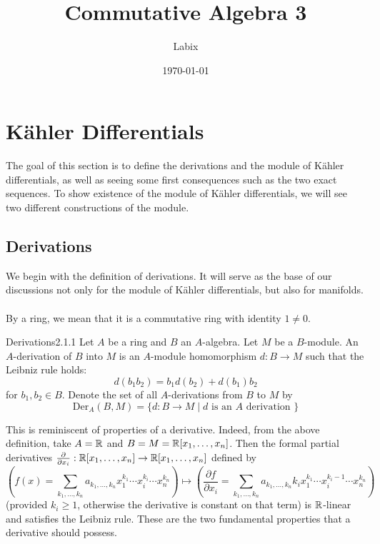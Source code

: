 \documentclass[a4paper]{article}
\title{Commutative Algebra 3}
\author{Labix}
\date{\today}
\begin{document}
\maketitle
\begin{abstract}
\end{abstract}
\pagebreak
\tableofcontents
\pagebreak

\section{Kähler Differentials}
The goal of this section is to define the derivations and the module of Kähler differentials, as well as seeing some first consequences such as the two exact sequences. To show existence of the module of Kähler differentials, we will see two different constructions of the module. 

\subsection{Derivations}
We begin with the definition of derivations. It will serve as the base of our discussions not only for the module of Kähler differentials, but also for manifolds. \\~\\

By a ring, we mean that it is a commutative ring with identity $1\neq 0$. 

\begin{defn}{Derivations}{2.1.1} Let $A$ be a ring and $B$ an $A$-algebra. Let $M$ be a $B$-module. An $A$-derivation of $B$ into $M$ is an $A$-module homomorphism $d:B\to M$ such that the Leibniz rule holds: $$d(b_1b_2)=b_1d(b_2)+d(b_1)b_2$$ for $b_1,b_2\in B$. Denote the set of all $A$-derivations from $B$ to $M$ by $$\text{Der}_A(B,M)=\{d:B\to M\;|\;d\text{ is an }A\text{ derivation }\}$$
\end{defn}

This is reminiscent of properties of a derivative. Indeed, from the above definition, take $A=\mathbb{R}$ and $B=M=\mathbb{R}[x_1,\dots,x_n]$. Then the formal partial derivatives $\frac{\partial}{\partial x_i}:\mathbb{R}[x_1,\dots,x_n]\to\mathbb{R}[x_1,\dots,x_n]$ defined by $$\left(f(x)=\sum_{k_1,\dots,k_n}a_{k_1,\dots,k_n}x_1^{k_1}\cdots x_i^{k_i}\cdots x_n^{k_n}\right)\mapsto\left(\frac{\partial f}{\partial x_i}=\sum_{k_1,\dots,k_n}a_{k_1,\dots,k_n}k_ix_1^{k_1}\cdots x_i^{k_i-1}\cdots x_n^{k_n}\right)$$ (provided $k_i\geq 1$, otherwise the derivative is constant on that term) is $\mathbb{R}$-linear and satisfies the Leibniz rule. These are the two fundamental properties that a derivative should possess. \\~\\
\end{document}
